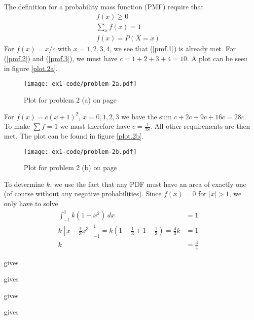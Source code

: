 \documentclass[a4paper,english,12pt]{article}
\begin{document}
The definition for a probability mass function (PMF) require that
\begin{gather}
  f(x) \geqslant 0 \label{pmf.1} \\
  \sum_x{f(x)} = 1 \label{pmf.2} \\
  f(x) = P(X=x) \label{pmf.3}
\end{gather}
For $f(x) = x/c$ with $x=1,2,3,4$, we see that (\ref{pmf.1}) is already met.
For (\ref{pmf.2}) and (\ref{pmf.3}), we must have $c=1+2+3+4=10$. A plot can be
seen in figure \vref{plot.2a}.

\begin{figure}[h]
  \texttt{[image: ex1-code/problem-2a.pdf]}
  \caption{Plot for problem 2 (a) on page \pageref{problem.2 (a)}}
  \label{plot.2a}
\end{figure}

For $f(x) = c(x+1)^2$, $x=0,1,2,3$ we have the sum $c+2c+9c+16c=28c$. To make
$\sum{f}=1$ we must therefore have $c=\frac{1}{28}$. All other requirements are
then met. The plot can be found in figure \vref{plot.2b}.

\begin{figure}[h]
  \texttt{[image: ex1-code/problem-2b.pdf]}
  \caption{Plot for problem 2 (b) on page \pageref{problem.2 (b)}}
  \label{plot.2b}
\end{figure}



To determine $k$, we use the fact that any PDF must have an area of exactly one
(of course without any negative probabilities). Since $f(x) = 0$ for $|x|
> 1$, we only have to solve
\begin{align*}
  \int_{-1}^{1}{k(1-x^2)~dx} &= 1 \\
  k\left[ x - \frac{1}{3}{x^3} \right]_{-1}^{1} =
  k\left( 1 - \frac{1}{3} + 1 - \frac{1}{3} \right) = \frac{4}{3}k &= 1 \\
   k &= \frac{3}{4}
\end{align*}






\texttt{} gives
\texttt{}

\texttt{} gives
\texttt{}

 gives
\texttt{}

\texttt{} gives
\texttt{}

\end{document}
